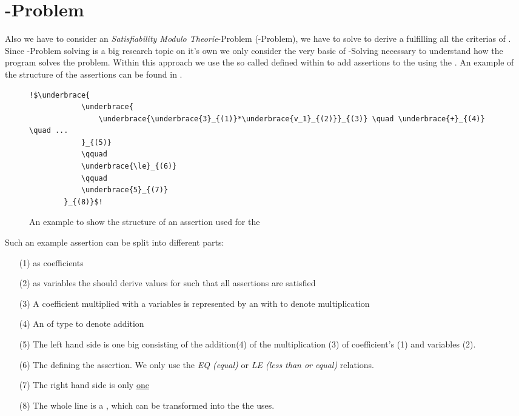 \section{-Problem}
\label{sec:smt-problem}
Also we have to consider an \textit{Satisfiability Modulo Theorie}-Problem (-Problem), we have to solve to derive a \gna fulfilling all the criterias of . Since -Problem solving is a big research topic on it's own we only consider the very basic of -Solving necessary to understand how the program solves the problem. \newline
Within this approach we use the so called  defined within \aprove to add assertions to the \solver using the \smtfactory. An example of the structure of the assertions can be found in . %

\begin{figure}[H]
	\begin{lstlisting}[escapechar = !]
		!$\underbrace{
			\underbrace{
				\underbrace{\underbrace{3}_{(1)}*\underbrace{v_1}_{(2)}}_{(3)} \quad \underbrace{+}_{(4)} \quad ...
			}_{(5)} 
			\qquad
			\underbrace{\le}_{(6)}
			\qquad
			\underbrace{5}_{(7)}
		}_{(8)}$!
	\end{lstlisting}
	\caption{An example to show the structure of an assertion used for the \solver}
	\label{ex:assertion-structure}
\end{figure}

Such an example assertion can be split into different parts: 
\begin{enumerate}
	\item[(1)]  as coefficients
	\item[(2)]  as variables the \solver should derive values for such that all assertions are satisfied
	\item[(3)] A coefficient multiplied with a variables is represented by an  with   to denote multiplication
	\item[(4)] An  of type  to denote addition
	\item[(5)] The left hand side is one big  consisting of the addition(4) of the multiplication (3) of coefficient's (1) and variables (2).
	\item[(6)] The  defining the assertion. We only use the \textit{EQ (equal)} or \textit{LE (less than or equal)} relations.
	\item[(7)] The right hand side is only \underline{one} 
	\item[(8)] The whole line is a , which can be transformed into the  the \solver uses.
\end{enumerate}

